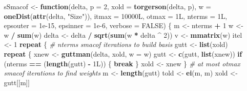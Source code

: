 \documentclass[
  12pt,
]{article}
\newenvironment{Shaded}{\begin{snugshade}}{\end{snugshade}}
\newcommand{\AttributeTok}[1]{\textcolor[rgb]{0.13,0.29,0.53}{#1}}
\newcommand{\CommentTok}[1]{\textcolor[rgb]{0.56,0.35,0.01}{\textit{#1}}}
\newcommand{\ConstantTok}[1]{\textcolor[rgb]{0.56,0.35,0.01}{#1}}
\newcommand{\ControlFlowTok}[1]{\textcolor[rgb]{0.13,0.29,0.53}{\textbf{#1}}}
\newcommand{\DataTypeTok}[1]{\textcolor[rgb]{0.13,0.29,0.53}{#1}}
\newcommand{\DecValTok}[1]{\textcolor[rgb]{0.00,0.00,0.81}{#1}}
\newcommand{\FloatTok}[1]{\textcolor[rgb]{0.00,0.00,0.81}{#1}}
\newcommand{\FunctionTok}[1]{\textcolor[rgb]{0.13,0.29,0.53}{\textbf{#1}}}
\newcommand{\NormalTok}[1]{#1}
\newcommand{\OtherTok}[1]{\textcolor[rgb]{0.56,0.35,0.01}{#1}}
\newcommand{\SpecialCharTok}[1]{\textcolor[rgb]{0.81,0.36,0.00}{\textbf{#1}}}
\newcommand{\StringTok}[1]{\textcolor[rgb]{0.31,0.60,0.02}{#1}}
\begin{document}
\begin{Shaded}
\begin{Highlighting}[]
\NormalTok{sSmacof }\OtherTok{\textless{}{-}}
  \ControlFlowTok{function}\NormalTok{(delta,}
           \AttributeTok{p =} \DecValTok{2}\NormalTok{,}
           \AttributeTok{xold =} \FunctionTok{torgerson}\NormalTok{(delta, p),}
           \AttributeTok{w =} \FunctionTok{oneDist}\NormalTok{(}\FunctionTok{attr}\NormalTok{(delta, }\StringTok{"Size"}\NormalTok{)),}
           \AttributeTok{itmax =} \DecValTok{10000}\DataTypeTok{L}\NormalTok{,}
           \AttributeTok{otmax =} \DecValTok{1}\DataTypeTok{L}\NormalTok{,}
           \AttributeTok{nterms =} \DecValTok{1}\DataTypeTok{L}\NormalTok{,}
           \AttributeTok{epsouter =} \FloatTok{1e{-}15}\NormalTok{,}
           \AttributeTok{epsinner =} \FloatTok{1e{-}6}\NormalTok{,}
           \AttributeTok{verbose =} \ConstantTok{FALSE}\NormalTok{) \{}
\NormalTok{    m }\OtherTok{\textless{}{-}}\NormalTok{ nterms }\SpecialCharTok{+} \DecValTok{1}
\NormalTok{    w }\OtherTok{\textless{}{-}}\NormalTok{ w }\SpecialCharTok{/} \FunctionTok{sum}\NormalTok{(w)}
\NormalTok{    delta }\OtherTok{\textless{}{-}}\NormalTok{ delta }\SpecialCharTok{/} \FunctionTok{sqrt}\NormalTok{(}\FunctionTok{sum}\NormalTok{(w }\SpecialCharTok{*}\NormalTok{ delta }\SpecialCharTok{\^{}} \DecValTok{2}\NormalTok{))}
\NormalTok{    v }\OtherTok{\textless{}{-}} \FunctionTok{mmatrix}\NormalTok{(w)}
\NormalTok{    itel }\OtherTok{\textless{}{-}} \DecValTok{1}
    \ControlFlowTok{repeat}\NormalTok{ \{}
      \CommentTok{\# nterms smacof iterations to build basis}
\NormalTok{      gutt }\OtherTok{\textless{}{-}} \FunctionTok{list}\NormalTok{(xold)}
      \ControlFlowTok{repeat}\NormalTok{ \{}
\NormalTok{        xnew }\OtherTok{\textless{}{-}} \FunctionTok{guttman}\NormalTok{(delta, xold, }\AttributeTok{w =}\NormalTok{ w)}
\NormalTok{        gutt }\OtherTok{\textless{}{-}} \FunctionTok{c}\NormalTok{(gutt, }\FunctionTok{list}\NormalTok{(xnew))}
        \ControlFlowTok{if}\NormalTok{ (nterms }\SpecialCharTok{==}\NormalTok{ (}\FunctionTok{length}\NormalTok{(gutt) }\SpecialCharTok{{-}} \DecValTok{1}\DataTypeTok{L}\NormalTok{)) \{}
          \ControlFlowTok{break}
\NormalTok{        \}}
\NormalTok{        xold }\OtherTok{\textless{}{-}}\NormalTok{ xnew}
\NormalTok{      \}}
      \CommentTok{\# at most otmax smacof iterations to find weights}
\NormalTok{      m }\OtherTok{\textless{}{-}} \FunctionTok{length}\NormalTok{(gutt)}
\NormalTok{      told }\OtherTok{\textless{}{-}} \FunctionTok{ei}\NormalTok{(m, m)}
\NormalTok{      xold }\OtherTok{\textless{}{-}}\NormalTok{ gutt[[m]]}

\end{Highlighting}
\end{Shaded}
\end{document}
